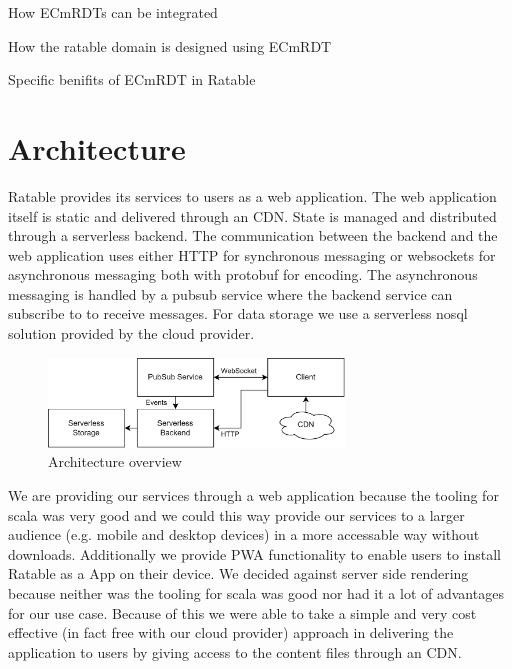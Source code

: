 \documentclass[
	ngerman,
	ruledheaders=section,   %
	class=report,		    %
	thesis={type=bachelor}, %
	accentcolor=9c,			%
	custommargins=true,    %
	marginpar=false,        %
	parskip=half-,          %
	fontsize=11pt,          %
]{tudapub}
\begin{document}
How ECmRDTs can be integrated 

How the ratable domain is designed using ECmRDT

Specific benifits of ECmRDT in Ratable

\chapter{Architecture}


Ratable provides its services to users as a web application. The web application itself is static and delivered through an CDN. State is managed and distributed through a serverless backend. The communication between the backend and the web application uses either HTTP for synchronous messaging or websockets for asynchronous messaging both with protobuf for encoding. The asynchronous messaging is handled by a pubsub service where the backend service can subscribe to to receive messages. For data storage we use a serverless nosql solution provided by the cloud provider.

\begin{figure}[h]
  \centering
  \includegraphics[width=0.7\textwidth]{architecture_services.png}
  \caption{Architecture overview}
\end{figure}


We are providing our services through a web application because the tooling for scala was very good and we could this way provide our services to a larger audience (e.g. mobile and desktop devices) in a more accessable way without downloads. Additionally we provide PWA functionality to enable users to install Ratable as a App on their device. We decided against server side rendering because neither was the tooling for scala was good nor had it a lot of advantages for our use case. Because of this we were able to take a simple and very cost effective (in fact free with our cloud provider) approach in delivering the application to users by giving access to the content files through an CDN. 
\end{document}
